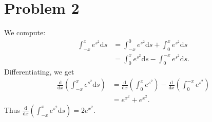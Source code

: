 \documentclass{article}
\begin{document}
\section*{Problem 2}
We compute:
\begin{align}
	\int_{-x}^x e^{s^2} \mathrm{d}s &= \int_{-x}^{0}e^{s^2} \mathrm{d}s + \int_{0}^{x}e^{s^2} \mathrm{d}s \\
	&= \int_{0}^{x}e^{s^2} \mathrm{d}s - \int_{0}^{-x}e^{s^2} \mathrm{d}s.
\end{align}
Differentiating, we get
\begin{align}
	\frac{\mathrm{d}}{\mathrm{d}x}\left(\int_{-x}^x e^{s^2} \mathrm{d}s\right) &= \frac{\mathrm{d}}{\mathrm{d}x}\left(\int_{0}^{x}e^{s^2}\right) - \frac{\mathrm{d}}{\mathrm{d}x}\left(\int_{0}^{-x}e^{s^2}\right) \\
	&= e^{x^2} + e^{x^2}.
\end{align}
Thus $\frac{\mathrm{d}}{\mathrm{d}x}\left(\int_{-x}^x e^{s^2} \mathrm{d}s\right) = 2e^{x^2}$.
\end{document}
